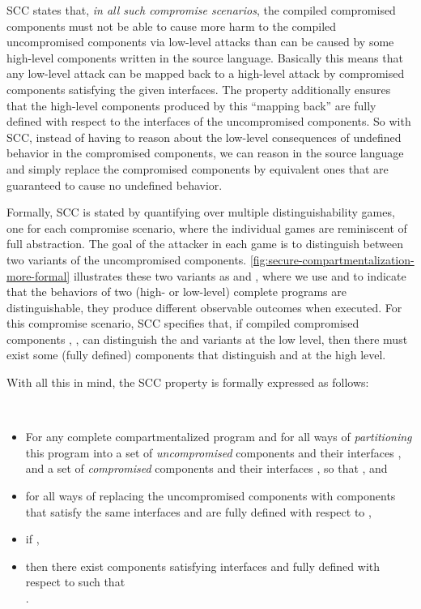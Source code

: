 \documentclass[10pt, conference, compsocconf, letterpaper, times]{IEEEtran}
\begin{document}
SCC states that, \emph{in all such
  compromise scenarios}, the compiled compromised components must not be
able to cause more harm to the compiled uncompromised components via
low-level attacks than can be caused by some high-level components written
in the source language.
Basically this means that any low-level attack can
be mapped back to a high-level attack by compromised components satisfying
the given interfaces.
\iffull
{}\fi
The property additionally ensures that the high-level components
produced by this ``mapping back'' are fully defined with respect to
the interfaces of the uncompromised components.
So with SCC,
instead of having to reason about the low-level consequences of
undefined behavior in the compromised components, we can
reason in the source language and simply replace the compromised
components by equivalent ones that are guaranteed to
cause no undefined behavior.

Formally, SCC is stated by quantifying over multiple
distinguishability games, one for each
compromise scenario, where the individual games are reminiscent of full
abstraction.
The goal of the attacker in each game is to distinguish between two
variants of the uncompromised components.
\autoref{fig:secure-compartmentalization-more-formal} illustrates
these two variants as  and , where we use  and
 to indicate that the behaviors of two (high- or
low-level) complete programs are distinguishable, \IE they produce
different observable outcomes when executed.
For this compromise scenario, SCC specifies that,
if compiled compromised components , ,
 can distinguish the  and
 variants at the low 
level, then 
there must exist some (fully defined) components 
that distinguish  and  at
the high level.

With all this in mind, the SCC property is
formally\ifsooner{}\fi{}
expressed as follows:

\begin{defn}[SCC]~
\begin{itemize}
\item For any complete compartmentalized program and
for all ways of {\em partitioning} this program into
a set of {\em uncompromised} components 
and their interfaces ,
and a set of {\em compromised} components 
and their interfaces , so that
, and 
\item for all ways of replacing the uncompromised components with
  components  that satisfy the same interfaces 
  and are {fully defined} with respect to , 
\item if ,
\item then there exist components  satisfying interfaces 
  and {fully defined} with respect to  such that\\
         .
\end{itemize}
\end{defn}
\end{document}
